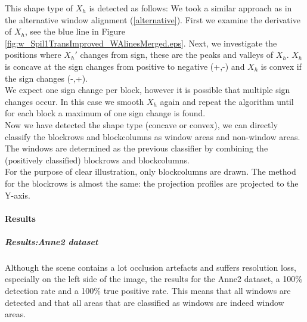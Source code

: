 This shape type of $X_h$ is detected as follows:
We took a similar approach as in the alternative window alignment
(\ref{alternative}). First we examine the derivative of $X_h$, see the blue line in Figure
\ref{fig:w_Spil1TransImproved_WAlinesMerged.eps}.  Next, we investigate the positions
where $X_{h}'$ changes from sign, these are the peaks and valleys of $X_h$.
$X_h$ is concave at the sign changes from positive to negative (+,-) and $X_h$
is convex if the sign changes (-,+).\\

We expect one sign change per block, however it is possible that multiple sign
changes occur. In this case we smooth $X_h$ again and repeat the algorithm
until for each block a maximum of one sign change is found. \\

Now we have detected the shape type (concave or convex), we can directly
classify the blockrows and blockcolumns as window areas and non-window areas.
The windows are determined as the previous classifier by combining the
(positively classified) blockrows and blockcolumns.\\

For the purpose of clear illustration, only blockcolumns are drawn. The method for
the blockrows is almost the same: the projection profiles are projected to the
Y-axis.

\newpage
\paragraph{Results} %

\subparagraph{Results:Anne2 dataset}

Although the scene contains a lot occlusion artefacts and suffers resolution
loss, especially on the left side of the image, the results for the Anne2
dataset, a 100\% detection rate and a 100\% true positive rate. This means that 
all windows are detected and that all areas that are classified as windows are
indeed window areas.\\
\clearpage


